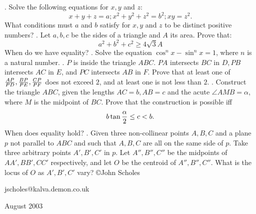 \nopagenumbers
{}
\vskip 25pt
. Solve the following equations for $x,y$ and $z$: $$x+y+z=a; x^2+y^2+z^2=b^2; xy=z^2.$$ What conditions must $a$ and $b$ satisfy for $x,y$ and $z$ to be distinct positive numbers?
\vskip 12pt
. Let $a,b,c$ be the sides of a triangle and $A$ its area. Prove that: $$a^2+b^2+c^2\ge4\sqrt3A$$ When do we have equality?
\vskip 12pt
. Solve the equation $\cos^nx-\sin^nx=1$, where $n$ is a natural number.
\vskip 12pt
. $P$ is inside the triangle $ABC$. $PA$ intersects $BC$ in $D,PB$ intersects $AC$ in $E$, and $PC$ intersects $AB$ in $F$. Prove that at least one of ${AP\over PD}, {BP\over PE},{CP\over PF}$ does not exceed $2$, and at least one is not less than $2$.
\vskip 12pt
. Construct the triangle $ABC$, given the lengths $AC=b,AB=c$ and the acute $\angle AMB=\alpha$, where $M$ is the midpoint of $BC$. Prove that the construction is possible iff $$b\tan{\alpha\over2}\le c<b.$$ When does equality hold?
\vskip 12pt
. Given three non-collinear points $A,B,C$ and a plane $p$ not parallel to $ABC$ and such that $A,B,C$ are all on the same side of $p$. Take three arbitrary points $A',B',C'$ in $p$. Let $A'',B'',C''$ be the midpoints of $AA',BB',CC'$ respectively, and let $O$ be the centroid of $A'',B'',C''$. What is the locus of $O$ as $A',B',C'$ vary?
\vskip 20pt
\noindent \copyright John Scholes

\noindent jscholes@kalva.demon.co.uk

 August 2003

\bye
